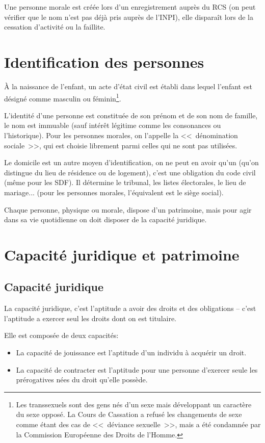 \documentclass[10pt,a4paper]{article}
\begin{document}
Une personne morale est créée lors d'un enregistrement auprès du RCS (on peut vérifier que le nom n'est pas déjà pris auprès de l'INPI), elle disparaît lors de la cessation d'activité ou la faillite.

\section{Identification des personnes}

À la naissance de l'enfant, un acte d'état civil est établi dans lequel l'enfant est désigné comme masculin ou féminin\footnote{Les transsexuels sont des gens nés d'un sexe mais développant un caractère du sexe opposé. La Cours de Cassation a refusé les changements de sexe comme étant des cas de <<~déviance sexuelle~>>, mais a été condamnée par la Commission Européenne des Droits de l'Homme.}.

L'identité d'une personne est constituée de son prénom et de son nom de famille, le nom est immuable (sauf intérêt légitime comme les consonances ou l'historique). Pour les personnes morales, on l'appelle la <<~dénomination sociale~>>, qui est choisie librement parmi celles qui ne sont pas utilisées.

Le domicile est un autre moyen d'identification, on ne peut en avoir qu'un (qu'on distingue du lieu de résidence ou de logement), c'est une obligation du code civil (même pour les SDF). Il détermine le tribunal, les listes électorales, le lieu de mariage... (pour les personnes morales, l'équivalent est le siège social).

Chaque personne, physique ou morale, dispose d'un patrimoine, mais pour agir dans sa vie quotidienne on doit disposer de la capacité juridique.

\section{Capacité juridique et patrimoine}

\subsection{Capacité juridique}

La capacité juridique, c'est l'aptitude a avoir des droits et des obligations -- c'est l'aptitude a exercer seul les droits dont on est titulaire.

Elle est composée de deux capacités:
\begin{itemize}
\item La capacité de jouissance est l'aptitude d'un individu à acquérir un droit.

\item La capacité de contracter est l'aptitude pour une personne d'exercer seule les prérogatives nées du droit qu'elle possède.
\end{itemize}
\end{document}
